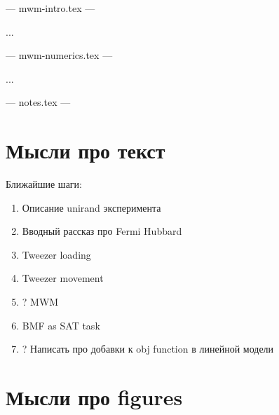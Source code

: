 


--- mwm-intro.tex ---

...

--- mwm-numerics.tex ---

...

--- notes.tex ---


\section*{Мысли про текст}

Ближайшие шаги:
\begin{enumerate}
	\item Описание unirand эксперимента
	\item Вводный рассказ про Fermi Hubbard
	\item Tweezer loading
	\item Tweezer movement
	\item ? MWM
	\item BMF as SAT task
	\item ? Написать про добавки к obj function в линейной модели
	
	



\end{enumerate}



\section*{Мысли про figures}


